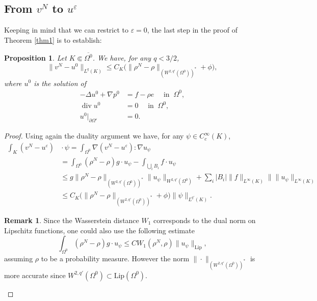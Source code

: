 \documentclass[10pt]{amsart}
\renewcommand{\div}{\operatorname{div}}
\theoremstyle{plain}
\newtheorem{prop}[thm]{Proposition}
\theoremstyle{definition}
\newtheorem{rem}{Remark}[section]
\let\pa\partial
\let\na\nabla
\let\eps\varepsilon
\newcommand{\Lip}{\mathrm{Lip}}
\let\oldbigcup\bigcup
\begin{document}
\subsection{From $v^N$ to $u^\varepsilon$}
Keeping in mind that we can restrict to $\eps = 0$, the last step in the proof of Theorem \ref{thm1} is to establish:
\begin{prop}
Let $K \Subset \overline{\Omega^0}$. We have, for any $q<3/2$,\vspace*{-3pt}
\[
\|v^N-u^0\|_{L^q(K)} \leq C_{K} \big(\|{\rho}^N-\rho\|_{(W^{2,q'}(\Omega^0))^*} + \phi \big),
\]
where $u^0$ is the solution of\vspace*{-3pt}
\begin{equation*}
\begin{aligned}
-\Delta u^0 + \na p^0 & = f - \rho e \quad \text{ in } \: \Omega^0, \\
\div u^0 & = 0 \quad \text{ in } \: \Omega^0,\\
u^0 \vert_{\pa \Omega^\eps} & = 0.
\end{aligned}
\end{equation*}
\end{prop}
\begin{proof}
Using again the duality argument we have, for any $\psi \in C^\infty_c(K)$,\vspace*{-3pt}
\begin{align*}
\int_K (v^N-u^\varepsilon)&{}\cdot \psi = \int_{\Omega^0} \nabla (v^N-u^\varepsilon): \nabla u_\psi \\
&= \int_{\Omega^0} ({\rho}^N-\rho) g \cdot u_\psi - \int_{\oldbigcup_i B_i} f \cdot u_\psi \\
&\leq g \|{\rho}^N-\rho\|_{(W^{2,q'}(\Omega^0))^*} \| u_\psi \|_{W^{2,q'}(\Omega^0)} + \sum_i |B_i| \|f\|_{L^\infty(K)} \|\| u_\psi \|_{L^\infty(K)}\\
&\leq C_{K} \big(\|{\rho}^N-\rho\|_{(W^{2,q'}(\Omega^0))^*} + \phi \big) \|\psi\|_{L^{q'}(K)}.
\end{align*}
\begin{rem} \label{rem:Wasserstein_versus_sob_neg}
Since the Wasserstein distance $W_1$ corresponds to the dual norm on Lipschitz functions, one could also use the following estimate
\[
\int_{\Omega^0} ({\rho}^N-\rho) g \cdot u_\psi \leq C W_1(\rho^N,\rho) \|u_\psi\|_{\Lip},
\]
assuming $\rho$ to be a probability measure. However the norm $\| \cdot \|_{(W^{2,q'}(\Omega^0))^*} $ is more accurate since $ W^{2,q'}(\Omega^0)\subset \Lip(\Omega^0)$.\qedhere
\end{rem}
\end{proof}
\end{document}
